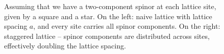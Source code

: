 \documentclass[11pt]{article}
\theoremstyle{definition}
\begin{document}
\begin{figure}[ht]
    \caption{Assuming that we have a two-component spinor at each lattice site, given by a square and a star. On the left: naive lattice with lattice spacing $a$, and every site carries all spinor components. On the right: staggered lattice -- spinor components are distributed across sites, effectively doubling the lattice spacing.}
    \label{fig:stag_lattice}
\end{figure}
\end{document}
